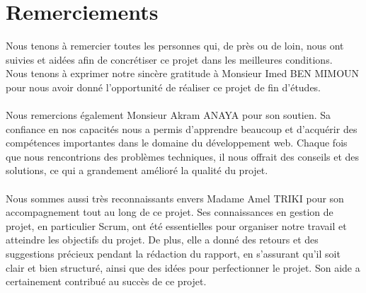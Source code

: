 \chapter*{\huge Remerciements}

\begin{Large}
Nous tenons à remercier toutes les personnes qui, de près ou de loin, nous ont suivies et aidées afin de concrétiser ce projet dans les meilleures conditions. \\
Nous tenons à exprimer notre sincère gratitude à Monsieur Imed BEN MIMOUN pour nous avoir donné l'opportunité de réaliser ce projet de fin d'études. \\ \\
Nous remercions également Monsieur Akram ANAYA pour son soutien. Sa confiance en nos capacités nous a permis d'apprendre beaucoup et d'acquérir des compétences importantes dans le domaine du développement web. Chaque fois que nous \sloppy rencontrions des problèmes techniques, il nous offrait des conseils et des solutions, ce qui a grandement amélioré la qualité du projet. \\ \\
Nous sommes aussi très reconnaissants envers Madame Amel TRIKI pour son accompagnement tout au long de ce projet. Ses connaissances en gestion de projet, en particulier Scrum, ont été essentielles pour organiser notre travail et atteindre les objectifs du projet. De plus, elle a donné des retours et des suggestions précieux pendant la rédaction du rapport, en s'assurant qu'il soit clair et bien structuré, ainsi que des idées pour perfectionner le projet. Son aide a certainement contribué au succès de ce projet. \\
\end{Large}
